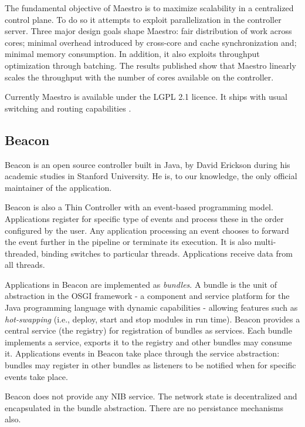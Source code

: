 \begin{itemize}
The fundamental objective of Maestro is to maximize scalability in a
centralized control plane. To do so it attempts to exploit
parallelization in the controller server. Three major design goals
shape Maestro: fair distribution of work across cores; minimal
overhead introduced by cross-core and cache synchronization and;
minimal memory consumption. In addition, it also
exploits throughput optimization through batching. The results
published show that Maestro linearly scales the throughput with the number of cores
available on the controller. 


Currently Maestro is available under the LGPL 2.1 licence. It ships
with usual switching  and routing capabilities \cite{maestro}.

\subsection{Beacon}
\label{sec:beacon}
Beacon is an open source controller built in Java, by David Erickson during his academic studies in Stanford University. 
He is, to our knowledge, the only official maintainer of the
application. 

Beacon is also a Thin Controller with  an event-based programming model. Applications register for
specific type of events and process these  in the order
configured by the user. Any application processing an event chooses to forward the
event further in the pipeline or terminate its execution. It is also
multi-threaded, binding switches to particular threads. Applications receive data from all threads.

Applications in Beacon are implemented as \emph{bundles}. A bundle is the
unit of abstraction in the OSGI \cite{osgi} framework - a component and service
platform for the Java programming language with dynamic capabilities -
allowing features such as \emph{hot-swapping} (i.e., deploy, start and
stop modules in run time). 
Beacon provides a central service (the registry) for registration of bundles as
services. Each bundle implements a service, exports it to the registry and
other bundles may consume it. Applications events in Beacon take place
through the service abstraction: bundles may register in other bundles as
listeners to be notified when for specific events take place. 

Beacon does not provide any NIB service. The network state is
decentralized and encapsulated in the bundle abstraction. There are
no persistance  mechanisms also. 


\end{itemize}
